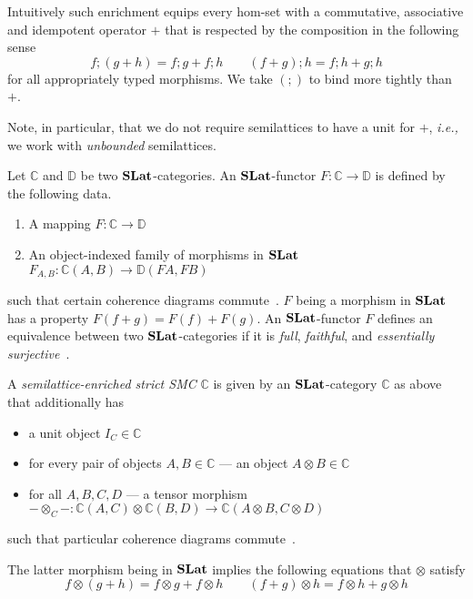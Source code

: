 Intuitively such enrichment equips every hom-set with a commutative, associative and idempotent operator $+$ that is respected by the composition in the following sense
\[
	f ; (g+h) = f;g + f;h \qquad (f+g) ; h = f;h + g;h
\]
for all appropriately typed morphisms. 
We take $(;\!)$ to bind more tightly than $+$.

Note, in particular,  that we do not require semilattices to have a unit for $+$, \textit{i.e.,} we work with \textit{unbounded} semilattices.

\begin{definition}
	Let $\mathbb{C}$ and $\mathbb{D}$ be two $\mathbf{SLat}$-categories.
	An $\mathbf{SLat}$-functor $F : \mathbb{C} \to \mathbb{D}$ is defined by the following data.
	\begin{enumerate}
	  \item A mapping $F : \mathbb{C} \to \mathbb{D}$
	  \item An object-indexed family of morphisms in $\mathbf{SLat}$ $F_{A,B} : \mathbb{C}(A,B) \to \mathbb{D}(FA,FB)$
	\end{enumerate}
	such that certain coherence diagrams commute~\cite{Borceux_1994}.
	$F$ being a morphism in $\mathbf{SLat}$ has a property $F(f + g) = F(f) + F(g)$.
	An $\mathbf{SLat}$-functor $F$ defines an equivalence between two $\mathbf{SLat}$-categories if it is \textit{full}, \textit{faithful}, and \textit{essentially surjective}~\cite{Kelly2022BASICCO}.
\end{definition}

\begin{definition}\label{def:enriched-prop}
A \textit{semilattice-enriched strict SMC}  $\mathbb{C}$ is given by an $\mathbf{SLat}$-category $\mathbb{C}$ as above that additionally has
\begin{itemize}
\item a unit object $I_{C} \in \mathbb{C}$
\item for every pair of objects $A,B \in \mathbb{C}$ --- an object $A \otimes B \in \mathbb{C}$
\item for all $A,B,C,D$ --- a tensor morphism $ - \otimes_{C} - : \mathbb{C}(A,C) \otimes \mathbb{C}(B,D) \to \mathbb{C}(A \otimes B, C \otimes D)$
\end{itemize}
such that particular coherence diagrams commute~\cite{enriched_monoidal}.
\end{definition}
The latter morphism being in $\mathbf{SLat}$ implies the following equations that $\otimes$ satisfy
\[
f \otimes (g+h) = f \otimes g + f \otimes h \qquad (f+g) \otimes h = f \otimes h + g \otimes h
\]

